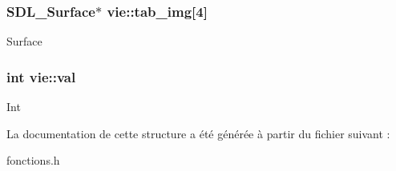 \subsubsection[{\texorpdfstring{tab\+\_\+img}{tab_img}}]{\setlength{\rightskip}{0pt plus 5cm}S\+D\+L\+\_\+\+Surface$\ast$ vie\+::tab\+\_\+img\mbox{[}4\mbox{]}}\hypertarget{structvie_a979731322bbb07c11075b549718f6416}{}\label{structvie_a979731322bbb07c11075b549718f6416}
Surface 
\subsubsection[{\texorpdfstring{val}{val}}]{\setlength{\rightskip}{0pt plus 5cm}int vie\+::val}\hypertarget{structvie_a869d0f8aa7f186ea5117f7e8df5c3be6}{}\label{structvie_a869d0f8aa7f186ea5117f7e8df5c3be6}
Int 

La documentation de cette structure a été générée à partir du fichier suivant \+:\begin{DoxyCompactItemize}
\item 
fonctions.\+h\end{DoxyCompactItemize}
